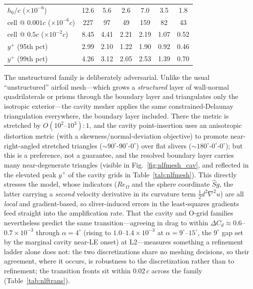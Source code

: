 \documentclass[journal]{new-aiaa}
\begin{document}
\begin{table}[tp]
\begin{tabular}{l cccccc}
    \addlinespace
    $h_0/c$ ($\times10^{-6}$)                & 12.6 & 5.6 & 2.6 & 7.0 & 3.5 & 1.8 \\
    cell @ $0.001c$ ($\times10^{-6}c$)       & 227 & 97 & 49 & 159 & 82 & 43 \\
    cell @ $0.5c$ ($\times10^{-2}c$)         & 8.45 & 4.41 & 2.21 & 2.19 & 1.07 & 0.52 \\
    \addlinespace
    $y^+$ (95th pct)                         & 2.99 & 2.10 & 1.22 & 1.90 & 0.92 & 0.46 \\
    $y^+$ (99th pct)                         & 4.26 & 3.12 & 2.05 & 2.53 & 1.39 & 0.70 \\
    \bottomrule
  \end{tabular}
\end{table}

The unstructured family is deliberately adversarial. Unlike the usual
``unstructured'' airfoil mesh---which grows a \emph{structured} layer of
wall-normal quadrilaterals or prisms through the boundary layer and triangulates
only the isotropic exterior---the cavity mesher applies the same
constrained-Delaunay triangulation everywhere, the boundary layer
included. There the metric is stretched by
$O(10^2\text{--}10^3)\!:\!1$, and the cavity point-insertion uses an anisotropic
distortion metric (with a skewness/normal-deviation objective) to promote
near-right-angled stretched triangles ($\sim\!90^\circ$-$90^\circ$-$0^\circ$)
over flat slivers ($\sim\!180^\circ$-$0^\circ$-$0^\circ$); but this is a
preference, not a guarantee, and the resolved boundary layer carries many
near-degenerate triangles (visible in Fig.~\ref{fig:nlfmesh_cav}, and reflected in
the elevated peak $y^+$ of the cavity grids in Table~\ref{tab:nlfmesh}). This directly
stresses the model, whose indicators ($Re_\Omega$ and the sphere coordinate
$\hat S g$, the latter carrying a \emph{second} velocity derivative in its
curvature term $\tfrac12 d^2\nabla^2u$) are all \emph{local} and gradient-based,
so sliver-induced errors in the least-squares gradients feed
straight into the amplification rate. That the cavity and O-grid families
nevertheless predict the same transition---agreeing in drag to within
$\Delta C_d\!\approx\!0.6$--$0.7\!\times\!10^{-3}$ through
$\alpha\!=\!4^\circ$ (rising to $1.0$--$1.4\!\times\!10^{-3}$ at
$\alpha\!=\!9^\circ$--$15^\circ$, the $9^\circ$ gap set by the marginal
cavity near-LE onset) at L2---measures something a refinement ladder
alone does not: the two discretizations share no meshing decisions, so
their agreement, where it occurs, is robustness to the discretization
rather than to refinement; the
transition fronts sit within $0.02\,c$ across the
family (Table~\ref{tab:nlftrans}).
\end{document}
